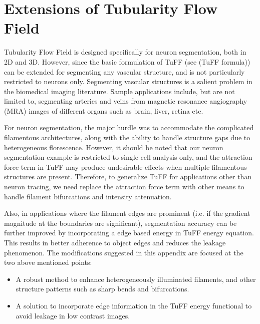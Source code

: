 \chapter{Extensions of Tubularity Flow Field} 

\label{AppendixLDE} %


Tubularity Flow Field is  designed  specifically for neuron segmentation, both in 2D and 3D. However, since the basic formulation of TuFF (see (TuFF formula)) can be extended for segmenting any vascular structure,  and is not particularly  restricted to neurons only. Segmenting vascular structures is a salient problem in the biomedical imaging literature. Sample applications include, but are not limited to, segmenting arteries and veins from magnetic resonance angiography (MRA) images of different organs such as brain, liver, retina etc. 

For neuron segmentation, the major hurdle was to accommodate the complicated filamentous architectures, along with the ability to handle structure gaps due to heterogeneous florescence. However, it should be noted that our neuron segmentation example is restricted to single cell analysis only, and the attraction force term in TuFF may produce undesirable effects when multiple  filamentous structures are present. Therefore, to generalize TuFF for applications other than neuron tracing, we need replace the attraction force term with other means to handle filament bifurcations and intensity  attenuation.

Also, in applications where the filament edges are prominent (i.e. if the gradient magnitude at the boundaries are significant), segmentation accuracy can be further improved by incorporating a edge based energy in TuFF energy equation. This results in better adherence to object edges and reduces the leakage phenomenon. The modifications suggested in this appendix are focused at the two above mentioned points:
\begin{itemize}
 \item A robust method to enhance heterogeneously  illuminated filaments, and other structure patterns such as sharp bends and bifurcations. 
 \item A solution to incorporate edge information in the TuFF energy functional to avoid leakage in low contrast images.
\end{itemize}


